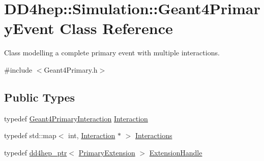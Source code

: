 \hypertarget{class_d_d4hep_1_1_simulation_1_1_geant4_primary_event}{
\section{DD4hep::Simulation::Geant4PrimaryEvent Class Reference}
\label{class_d_d4hep_1_1_simulation_1_1_geant4_primary_event}
}


Class modelling a complete primary event with multiple interactions.  


{\ttfamily \#include $<$Geant4Primary.h$>$}\subsection*{Public Types}
\begin{DoxyCompactItemize}
\item 
typedef \hyperlink{class_d_d4hep_1_1_simulation_1_1_geant4_primary_interaction}{Geant4PrimaryInteraction} \hyperlink{class_d_d4hep_1_1_simulation_1_1_geant4_primary_event_afe42410b9331b521808a49120f402bd9}{Interaction}
\item 
typedef std::map$<$ int, \hyperlink{class_d_d4hep_1_1_simulation_1_1_geant4_primary_interaction}{Interaction} $\ast$ $>$ \hyperlink{class_d_d4hep_1_1_simulation_1_1_geant4_primary_event_adae96b166507159c2dd92b4e20352a52}{Interactions}
\item 
typedef \hyperlink{class_d_d4hep_1_1dd4hep__ptr}{dd4hep\_\-ptr}$<$ \hyperlink{class_d_d4hep_1_1_simulation_1_1_primary_extension}{PrimaryExtension} $>$ \hyperlink{class_d_d4hep_1_1_simulation_1_1_geant4_primary_event_acfe0b3b7ad6f183fe75a6539b4470418}{ExtensionHandle}
\end{DoxyCompactItemize}
